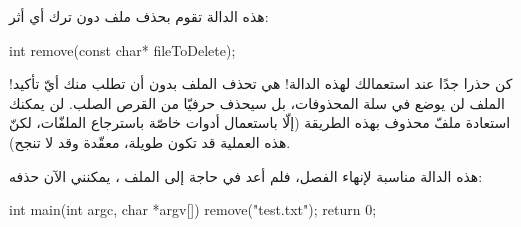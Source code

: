 هذه الدالة تقوم بحذف ملف دون ترك أي أثر:

\begin{Csource}
int remove(const char* fileToDelete);
\end{Csource}

\begin{critical}
  كن حذرا جدًا عند استعمالك لهذه الدالة! هي تحذف الملف بدون أن تطلب منك أيّ تأكيد! الملف لن يوضع في سلة المحذوفات، بل سيحذف حرفيّا من القرص الصلب. لن يمكنك استعادة ملفّ محذوف بهذه الطريقة (إلّا باستعمال أدوات خاصّة باسترجاع الملفّات، لكنّ هذه العملية قد تكون طويلة، معقّدة وقد لا تنجح).
\end{critical}

هذه الدالة مناسبة لإنهاء الفصل، فلم أعد في حاجة إلى الملف
،
يمكنني الآن حذفه:

\begin{Csource}
int main(int argc, char *argv[])
{
    remove("test.txt");
    return 0;
}
\end{Csource}
